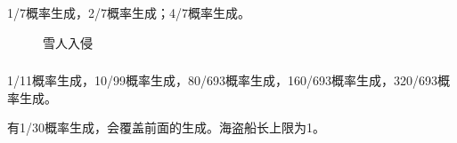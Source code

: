 \subsubsection{}
1/7概率生成，2/7概率生成；4/7概率生成。
\begin{figure}[h]
    \centering
    \caption{雪人入侵}
\end{figure}

\subsubsection{}
1/11概率生成，10/99概率生成，80/693概率生成，160/693概率生成，320/693概率生成。

有1/30概率生成，会覆盖前面的生成。海盗船长上限为1。

